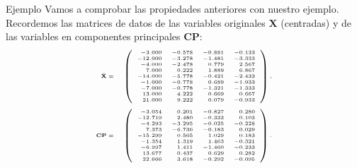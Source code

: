 \documentclass[
  ignorenonframetext,
]{beamer}
\begin{document}
\begin{frame}{Ejemplo}
\label{ejemplo-15}
Vamos a comprobar las propiedades anteriores con nuestro ejemplo.
Recordemos las matrices de datos de las variables originales
\(\mathbf{X}\) (centradas) y de las variables en componentes principales
\(\mathbf{CP}\): \[
{\tiny 
\begin{array}{rl}
\tilde{\mathbf{X}} =& 
\left(
\begin{array}{rrrr}
-3.000 & -0.578 & -0.881 & -0.133 \\
 -12.000 & -3.278 & -1.481 & -3.333 \\
 -4.000 & -2.478 & 0.779 & 2.567 \\
 7.000 & 0.222 & 1.889 & 6.867 \\
 -14.000 & -5.778 & -0.421 & -2.433 \\
 -1.000 & -0.778 & 0.689 & -1.933 \\
 -7.000 & -0.778 & -1.321 & -1.333 \\
 13.000 & 4.222 & 0.669 & 0.667 \\
 21.000 & 9.222 & 0.079 & -0.933 
\end{array}
\right) ,
\\ &\\
\mathbf{CP}= &
\left(
\begin{array}{rrrr}
-3.054 & 0.201 & -0.827 & 0.280 \\
 -12.719 & 2.480 & -0.333 & 0.103 \\
 -4.293 & -3.295 & -0.025 & -0.228 \\
 7.373 & -6.736 & -0.183 & 0.029 \\
 -15.299 & 0.565 & 1.029 & 0.183 \\
 -1.354 & 1.319 & 1.463 & -0.321 \\
 -6.997 & 1.411 & -1.460 & -0.233 \\
 13.677 & 0.437 & 0.629 & 0.282 \\
 22.666 & 3.618 & -0.292 & -0.095 
\end{array}
\right).
\end{array}}
\]
\end{frame}
\end{document}
